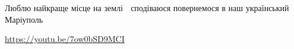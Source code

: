  
 
 
 
 

\qqSecCmt


Люблю найкраще місце на землі 🥰 сподіваюся повернемося в наш український Маріуполь


\url{https://youtu.be/7ow0bSD9MCI}
